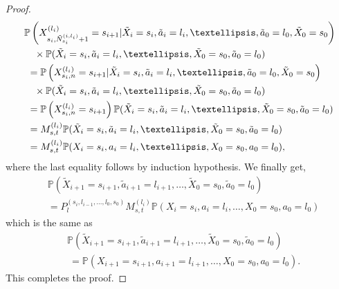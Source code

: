 \documentclass[10pt,a4paper]{amsart}
\newcommand{\Pbb}{\mathbb{P}}
\newcommand{\lp}{\left(}
\newcommand{\pow}[1]{^{(#1)}}%
\newcommand{\prob}{\Pbb}
\newcommand{\rp}{\right)}
\begin{document}
\begin{proof}
\begin{align*}
    &  \prob\lp X_{s_i,\Tilde{N}_{s_i}^{(i,l_i)}+1}\pow{l_i}=s_{i+1}|\tilde X_i=s_i,\tilde a_{i}=l_i,\dots,\tilde a_0=l_0,\tilde X_0=s_0\rp\\
    &\quad \times \prob(\tilde X_i=s_i,\tilde a_i=l_i,\dots,\tilde X_0=s_0,\tilde a_0=l_0)\\
    &  \ =  \prob\lp X_{s_i,n}\pow{l_i}=s_{i+1}|\tilde X_i=s_i,\tilde a_{i}=l_i,\dots,\tilde a_0=l_0,\tilde X_0=s_0\rp\\
    &\quad \times \prob(\tilde X_i=s_i,\tilde a_i=l_i,\dots,\tilde X_0=s_0,\tilde a_0=l_0)\\
    &  \ =\prob\lp X_{s_i,n}\pow{l_i}=s_{i+1}\rp \prob(\tilde X_i=s_i,\tilde a_i=l_i,\dots,\tilde X_0=s_0,\tilde a_0=l_0)\\
    &\ = M_{s,t}\pow{l_i}\prob(\tilde X_i=s_i,\tilde a_i=l_i,\dots,\tilde X_0=s_0,\tilde a_0=l_0)\\
    &\ =M_{s,t}\pow{l_i}\prob(X_i=s_i, a_i=l_i,\dots,X_0=s_0, a_0=l_0),
\end{align*}
where the last equality follows by induction hypothesis. We finally get,
\begin{align*}
   & \prob\lp \tilde X_{i+1}=s_{i+1},\tilde a_{i+1}=l_{i+1},\dots,\tilde X_0=s_0,\tilde a_0=l_0 \rp \\
   & =  P_l\pow{s_i,l_{i-1},\dots,l_0,s_0} M_{s,t}\pow{l_i}\prob(X_i=s_i, a_i=l_i,\dots,X_0=s_0, a_0=l_0)
\end{align*}
which is the same as 
\begin{align*}
   &\prob\lp \tilde X_{i+1}=s_{i+1},\tilde a_{i+1}=l_{i+1},\dots,\tilde X_0=s_0,\tilde a_0=l_0 \rp \\ 
   &\ = \prob\lp  X_{i+1}=s_{i+1}, a_{i+1}=l_{i+1},\dots, X_0=s_0, a_0=l_0 \rp. 
\end{align*}
This completes the proof.
\end{proof}
\end{document}
